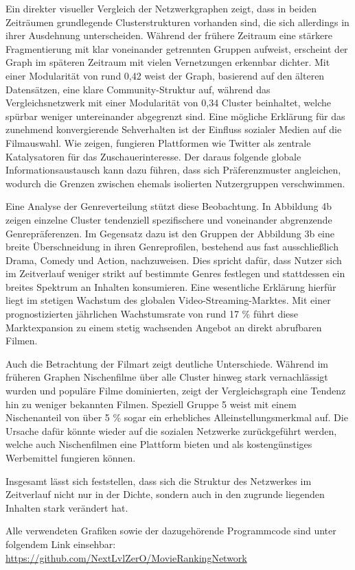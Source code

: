 Ein direkter visueller Vergleich der Netzwerkgraphen zeigt, dass in beiden Zeiträumen grundlegende Clusterstrukturen vorhanden sind, die sich allerdings in ihrer Ausdehnung unterscheiden.
Während der frühere Zeitraum eine stärkere Fragmentierung mit klar voneinander getrennten Gruppen aufweist, erscheint der Graph im späteren Zeitraum mit vielen Vernetzungen erkennbar dichter.
Mit einer Modularität von rund 0,42 weist der Graph, basierend auf den älteren Datensätzen, eine klare Community-Struktur auf, während das Vergleichsnetzwerk mit einer Modularität von 0,34 Cluster beinhaltet, welche spürbar weniger untereinander abgegrenzt sind.
Eine mögliche Erklärung für das zunehmend konvergierende Sehverhalten ist der Einfluss sozialer Medien auf die Filmauswahl.
Wie \textcite{Wang2015} zeigen, fungieren Plattformen wie Twitter als zentrale Katalysatoren für das Zuschauerinteresse.
Der daraus folgende globale Informationsaustausch kann dazu führen, dass sich Präferenzmuster angleichen, wodurch die Grenzen zwischen ehemals isolierten Nutzergruppen verschwimmen.

Eine Analyse der Genreverteilung stützt diese Beobachtung.
In Abbildung 4b zeigen einzelne Cluster tendenziell spezifischere und voneinander abgrenzende Genrepräferenzen.
Im Gegensatz dazu ist den Gruppen der Abbildung 3b eine breite Überschneidung in ihren Genreprofilen, bestehend aus fast ausschließlich Drama, Comedy und Action, nachzuweisen.
Dies spricht dafür, dass Nutzer sich im Zeitverlauf weniger strikt auf bestimmte Genres festlegen und stattdessen ein breites Spektrum an Inhalten konsumieren.
Eine wesentliche Erklärung hierfür liegt im stetigen Wachstum des globalen Video-Streaming-Marktes.
Mit einer prognostizierten jährlichen Wachstumsrate von rund 17 \% führt diese Marktexpansion zu einem stetig wachsenden Angebot an direkt abrufbaren Filmen. \parencite{Fortune2026}

Auch die Betrachtung der Filmart zeigt deutliche Unterschiede.
Während im früheren Graphen Nischenfilme über alle Cluster hinweg stark vernachlässigt wurden und populäre Filme dominierten, zeigt der Vergleichsgraph eine Tendenz hin zu weniger bekannten Filmen.
Speziell Gruppe 5 weist mit einem Nischenanteil von über 5 \% sogar ein erhebliches Alleinstellungsmerkmal auf.
Die Ursache dafür könnte wieder auf die sozialen Netzwerke zurückgeführt werden, welche auch Nischenfilmen eine Plattform bieten und als kostengünstiges Werbemittel fungieren können.

Insgesamt lässt sich feststellen, dass sich die Struktur des Netzwerkes im Zeitverlauf nicht nur in der Dichte, sondern auch in den zugrunde liegenden Inhalten stark verändert hat.

\vspace{1cm}

Alle verwendeten Grafiken sowie der dazugehörende Programmcode sind unter folgendem Link einsehbar: \url{https://github.com/NextLvlZerO/MovieRankingNetwork}